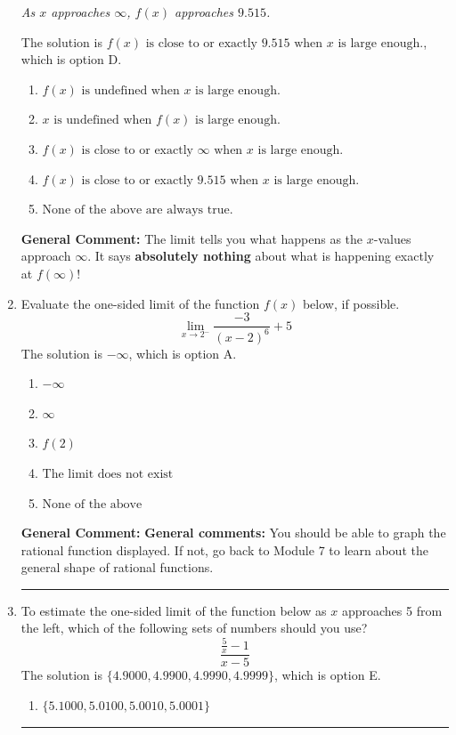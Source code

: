 \documentclass{extbook}[14pt]
\newcommand{\litem}[1]{\item #1

\rule{\textwidth}{0.4pt}}
\begin{document}
\begin{enumerate}
{\begin{center}
    \textit{ As $x$ approaches $\infty$, $f(x)$ approaches $9.515$. }
\end{center}
The solution is \( f(x) \text{ is close to or exactly } 9.515 \text{ when } x \text{ is large enough}. \), which is option D.\begin{enumerate}[label=\Alph*.]
\item \( f(x) \text{ is undefined when } x \text{ is large enough}. \)


\item \( x \text{ is undefined when } f(x) \text{ is large enough}. \)


\item \( f(x) \text{ is close to or exactly } \infty \text{ when } x \text{ is large enough}. \)


\item \( f(x) \text{ is close to or exactly } 9.515 \text{ when } x \text{ is large enough}. \)


\item \( \text{None of the above are always true.} \)


\end{enumerate}

\textbf{General Comment:} The limit tells you what happens as the $x$-values approach $\infty$. It says \textbf{absolutely nothing} about what is happening exactly at $f(\infty)$!
}
\litem{
Evaluate the one-sided limit of the function $f(x)$ below, if possible.
\[ \lim_{x \rightarrow 2^-} \frac{-3}{(x-2)^6}+5 \]The solution is \( -\infty \), which is option A.\begin{enumerate}[label=\Alph*.]
\item \( -\infty \)


\item \( \infty \)


\item \( f(2) \)


\item \( \text{The limit does not exist} \)


\item \( \text{None of the above} \)


\end{enumerate}

\textbf{General Comment:} \textbf{General comments:} You should be able to graph the rational function displayed. If not, go back to Module 7 to learn about the general shape of rational functions.
}
\litem{
To estimate the one-sided limit of the function below as $x$ approaches 5 from the left, which of the following sets of numbers should you use?
\[ \frac{\frac{5}{x} - 1}{x - 5} \]The solution is \( \{ 4.9000, 4.9900, 4.9990, 4.9999 \} \), which is option E.\begin{enumerate}[label=\Alph*.]
\item \( \{ 5.1000, 5.0100, 5.0010, 5.0001 \} \)


\end{enumerate}}
\end{enumerate}
\end{document}

